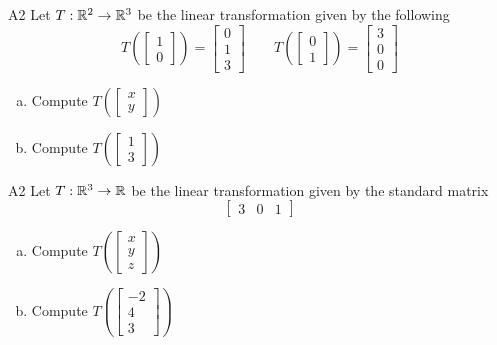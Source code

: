 \begin{problem}{A2}
Let $T: \mathbb{R}^2 \rightarrow \mathbb{R}^3$ be the linear transformation given by the following
\[
  T\left(\begin{bmatrix}1\\0\end{bmatrix}\right)
    =
  \begin{bmatrix} 0 \\ 1 \\ 3 \end{bmatrix}
\hspace{2em}
  T\left(\begin{bmatrix}0\\1\end{bmatrix}\right)
    =
  \begin{bmatrix} 3 \\ 0 \\ 0 \end{bmatrix}
\]
\begin{enumerate}[(a)]
\item Compute \( T\left( \begin{bmatrix}x\\ y \end{bmatrix} \right) \)
\item Compute \( T\left( \begin{bmatrix} 1\\ 3\end{bmatrix} \right) \)
\end{enumerate}
\end{problem}



\begin{problem}{A2}
Let $T: \mathbb{R}^3 \rightarrow \mathbb{R}$ be the linear transformation given by the standard matrix
$$\begin{bmatrix} 3 & 0 & 1 \end{bmatrix}$$
\begin{enumerate}[(a)]
\item Compute \( T\left( \begin{bmatrix}x\\ y \\ z  \end{bmatrix} \right) \)
\item Compute \( T\left( \begin{bmatrix} -2 \\ 4 \\ 3\end{bmatrix} \right) \)
\end{enumerate}
\end{problem}
